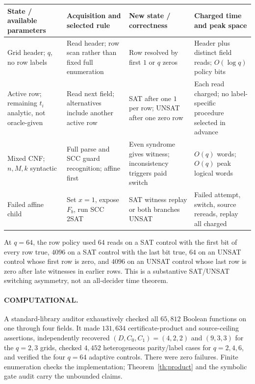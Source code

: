\documentclass[11pt]{article}
\begin{document}
\begin{center}\small
\begin{tabular}{@{}p{.16\linewidth}p{.23\linewidth}p{.22\linewidth}p{.27\linewidth}@{}}\toprule
State / available parameters & Acquisition and selected rule & New state / correctness & Charged time and peak space\\\midrule
Grid header; $q$, no row labels & Read header; row scan rather than fixed full enumeration & Row resolved by first $1$ or $q$ zeros & Header plus distinct field reads; $O(\log q)$ policy bits\\
Active row; remaining $t_i$ analytic, not oracle-given & Read next field; alternatives include another active row & SAT after one $1$ per row; UNSAT after one zero row & Each read charged; no label-specific procedure selected in advance\\
Mixed CNF; $n,M,k$ syntactic & Full parse and SCC guard recognition; affine first & Even syndrome gives witness; inconsistency triggers paid switch & $O(q)$ words; $O(q)$ peak logical words\\
Failed affine child & Set $x=1$, expose $F_b$, run SCC 2SAT & SAT witness replay or both branches UNSAT & Failed attempt, switch, source rereads, replay all charged\\\bottomrule
\end{tabular}
\end{center}

At $q=64$, the row policy used $64$ reads on a SAT control with the first bit
of every row true, $4096$ on a SAT control with the last bit true, $64$ on an
UNSAT control whose first row is zero, and $4096$ on an UNSAT control whose
last row is zero after late witnesses in earlier rows.  This is a substantive
SAT/UNSAT switching asymmetry, not an all-decider time theorem.

\paragraph{COMPUTATIONAL.}
A standard-library auditor exhaustively checked all $65{,}812$ Boolean
functions on one through four fields.  It made $131{,}634$ certificate-product
and source-ceiling assertions, independently recovered
$(D,C_0,C_1)=(4,2,2)$ and $(9,3,3)$ for the $q=2,3$ grids, checked $4{,}452$
heterogeneous parity/label cases for $q=2,4,6$, and verified the four $q=64$
adaptive controls.  There were zero failures.  Finite enumeration checks the
implementation; Theorem~\ref{th:product} and the symbolic gate audit carry the
unbounded claims.
\end{document}
